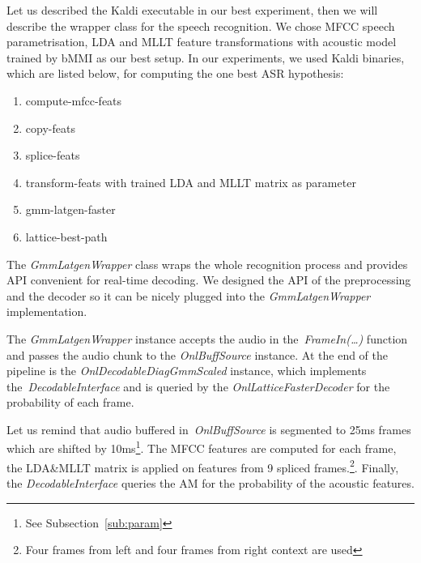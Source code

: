 Let us described the Kaldi executable in our best experiment,
then we will describe the wrapper class for the speech recognition.
We chose \ac{MFCC} speech parametrisation, \ac{LDA} and \ac{MLLT} feature transformations with 
acoustic model trained by \ac{bMMI} as our best setup.
In our experiments, we used Kaldi binaries, which are listed below, 
for computing the one best \ac{ASR} hypothesis:
\begin{enumerate}
    \item compute-mfcc-feats
    \item copy-feats
    \item splice-feats
    \item transform-feats with trained \ac{LDA} and \ac{MLLT} matrix as parameter
    \item \label{enum:latgen} gmm-latgen-faster
    \item lattice-best-path
\end{enumerate}


The {\it GmmLatgenWrapper}\/ class wraps the whole recognition process
and provides \ac{API} convenient for real-time decoding.
We designed the \ac{API} of the preprocessing and the decoder 
so it can be nicely plugged into the {\it GmmLatgenWrapper}\/ implementation.

The  {\it GmmLatgenWrapper}\/ instance accepts the audio in the~{\it FrameIn(\ldots)}\/
function and passes the audio chunk to the {\it OnlBuffSource}\/ instance.
At the end of the pipeline is the {\it OnlDecodableDiagGmmScaled}\/ instance,
which implements the~{\it DecodableInterface}\/ and is queried by the {\it OnlLatticeFasterDecoder}\/
for the probability of each frame.

Let us remind that audio buffered in~{\it OnlBuffSource} is 
segmented to 25ms frames which are shifted by 10ms\footnote{See Subsection~\ref{sub:param}}.
The \ac{MFCC} features are computed for each frame, the \ac{LDA}\&\ac{MLLT} matrix
is applied on features from 9 spliced frames.\footnote{Four frames from left 
and four frames from right context are used}. 
Finally, the {\it DecodableInterface}\/ queries the \acl{AM} for the probability of the acoustic features.


